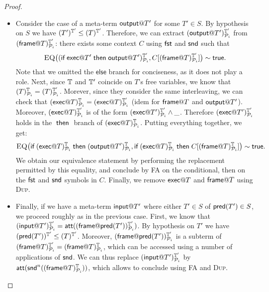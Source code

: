 \begin{proof}
\begin{itemize}
   \item Consider the case of a meta-term $\textsf{output} @ T'$ for some $T' \in S$.
     By hypothesis on $S$ we have $(T')^{\mathbb{T}'}_{} \leq (T)^{\mathbb{T}'}_{}$.
     Therefore, we can extract $(\textsf{output} @ T')^{\mathbb{T}'}_{\mathcal{P}_i}$ from $(\textsf{frame} @ T)^{\mathbb{T}'}_{\mathcal{P}_i}$:
     there exists some context $C$ using $\mathsf{fst}$ and $\mathsf{snd}$
     such that
     \[
       \textsc{EQ}\bigl(
       (
         \textsf{if}\; \textsf{exec} @ T' \;\textsf{then}\; \textsf{output} @ T')^{\mathbb{T}'}_{\mathcal{P}_i},
       C[(\textsf{frame} @ T)^{\mathbb{T}'}_{\mathcal{P}_i}]\bigr) \sim \textsf{true}.
     \]     
     Note that we omitted the $\mathsf{else}$ branch for conciseness, as it does not play a role.
     Next, since $\mathbb{T}$ and $\mathbb{T}'$ coincide on $T$'s free variables, we know that $(T)^{\mathbb{T}}_{\mathcal{P}_i} = (T)^{\mathbb{T}'}_{\mathcal{P}_i}$. Morever, since they consider the same interleaving, we can check that
     $(\textsf{exec} @ T)^{\mathbb{T}}_{\mathcal{P}_i} =
     (\textsf{exec} @ T)^{\mathbb{T}'}_{\mathcal{P}_i}$ (idem for $\textsf{frame} @ T$ and $\textsf{output} @ T'$).
     Moreover, $(\textsf{exec} @ T)^{\mathbb{T}'}_{\mathcal{P}_i}$ is of the form $(\textsf{exec} @ T')^{\mathbb{T}'}_{\mathcal{P}_i} \wedge \_$. Therefore $(\textsf{exec} @ T')^{\mathbb{T}'}_{\mathcal{P}_i}$ holds in the $\;\textsf{then}\;$ branch of $(\textsf{exec} @ T)^{\mathbb{T}}_{\mathcal{P}_i}$. Putting everything together, we get:
     \[
       \textsc{EQ}\bigl(
       \textsf{if}\; (\textsf{exec} @ T)^{\mathbb{T}}_{\mathcal{P}_i} \;\textsf{then}\;
       (\textsf{output} @ T')^{\mathbb{T}}_{\mathcal{P}_i},
       \textsf{if}\; (\textsf{exec} @ T)^{\mathbb{T}}_{\mathcal{P}_i} \;\textsf{then}\;
       C[(\textsf{frame} @ T)^{\mathbb{T}}_{\mathcal{P}_i}]
       \bigr)
       \sim \textsf{true}.
     \]
     We obtain our equivalence statement
     by performing the replacement permitted by this equality,
     and conclude by \textsc{FA} on the conditional, then on the
     $\mathsf{fst}$ and $\mathsf{snd}$ symbols in $C$. Finally, we remove $\textsf{exec} @ T$ and
     $\textsf{frame} @ T$ using \textsc{Dup}. 
     
   \item Finally, if we have a meta-term $\textsf{input} @ T'$ where either $T' \in S$
     of $\textsf{pred}(T') \in S$, we proceed roughly as in the previous case. First, we know that
     $(\textsf{input} @ T')^{\mathbb{T}'}_{\mathcal{P}_i} =
      \mathsf{att}((\textsf{frame} @ \textsf{pred}(T'))^{\mathbb{T}'}_{\mathcal{P}_i})$.
     By hypothesis on $T'$ we have
     $(\textsf{pred}(T'))^{\mathbb{T}'}_{} \leq (T)^{\mathbb{T}'}_{}$.
     Moreover, $(\textsf{frame} @ \textsf{pred}(T'))^{\mathbb{T}'}_{\mathcal{P}_i}$
     is a subterm of $(\textsf{frame} @ T)^{\mathbb{T}'}_{\mathcal{P}_i} =
     (\textsf{frame} @ T)^{\mathbb{T}}_{\mathcal{P}_i}$,
     which can be accessed using a number of applications of $\mathsf{snd}$.
     We can thus replace
     $(\textsf{input} @ T')^{\mathbb{T}'}_{\mathcal{P}_i}$
     by $\mathsf{att}(\mathsf{snd}^n((\textsf{frame} @ T)^{\mathbb{T}}_{\mathcal{P}_i}))$,
     which allows to conclude using \textsc{FA} and \textsc{Dup}.
     \qedhere
  \end{itemize}
\end{proof}

